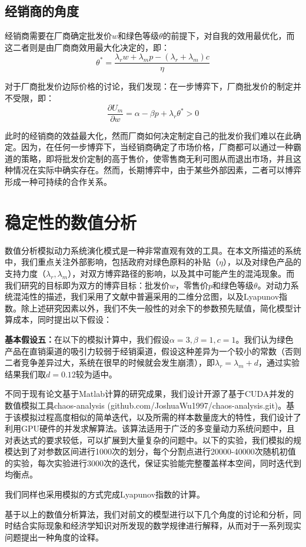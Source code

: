 \documentclass{article}
\begin{document}
\subsection{经销商的角度}
\par 经销商需要在厂商确定批发价$w$和绿色等级$\theta$的前提下，对自我的效用最优化，而这二者则是由厂商商效用最大化决定的，即：
\begin{equation}\label{t_star}
    \theta^*=\frac{\lambda_rw+\lambda_mp-(\lambda_r+\lambda_m)c}{\eta}
\end{equation}
\par 对于厂商批发价边际价格的讨论，我们发现：在一步博弈下，厂商批发价的制定并不受限，即：
\begin{equation}\label{w_star}
    \frac{\partial U_m}{\partial w}=\alpha-\beta p+\lambda_r\theta^*>0
\end{equation}
\par 此时的经销商的效益最大化，然而厂商如何决定制定自己的批发价我们难以在此确定。因为，在任何一步博弈下，当经销商确定了市场价格，厂商都可以通过一种霸道的策略，即将批发价定制的高于售价，使零售商无利可图从而退出市场，并且这种情况在实际中确实存在。然而，长期博弈中，由于某些外部因素，二者可以博弈形成一种可持续的合作关系。
\section{稳定性的数值分析}
\par 数值分析模拟动力系统演化模式是一种非常直观有效的工具。在本文所描述的系统中，我们重点关注外部影响，包括政府对绿色原料的补贴（$\eta$），以及对绿色产品的支持力度（$\lambda_r, \lambda_m$），对双方博弈路径的影响，以及其中可能产生的混沌现象。而我们研究的目标即为双方的博弈目标：批发价$w$，零售价$p$和绿色等级$\theta$。对动力系统混沌性的描述，我们采用了文献中普遍采用的二维分岔图，以及Lyapunov指数\cite{2017Tang}\cite{2018Zhang}\cite{2015Zhang}\cite{2018Huang}。除上述研究因素以外，我们不失一般性的对余下的参数预先赋值，简化模型计算成本，同时提出以下假设：
\par \textbf{基本假设五：}在以下的模拟计算中，我们假设$\alpha=3, \beta=1, c=1$。我们认为绿色产品在直销渠道的吸引力较弱于经销渠道，假设这种差异为一个较小的常数（否则二者竞争差异过大，系统在很早的时候就会发生崩溃），即$\lambda_r=\lambda_m+d$，通过实验结果我们取$d=0.12$较为适中。
\par 不同于现有论文基于Matlab计算的研究成果，我们设计开源了基于CUDA并发的数值模拟工具chaos-analysis (github.com/JoshuaWu1997/chaos-analysis.git)。基于该模拟过程高度相似的简单迭代，以及所需的样本数量庞大的特性，我们设计了利用GPU硬件的并发求解算法。该算法适用于广泛的多变量动力系统问题中，且对表达式的要求较低，可以扩展到大量复杂的问题中。以下的实验，我们模拟的规模达到了对参数区间进行1000次的划分，每个分割点进行20000-40000次随机初值的实验，每次实验进行3000次的迭代，保证实验能完整覆盖样本空间，同时迭代到均衡点。
\par 我们同样也采用模拟的方式完成Lyapunov指数的计算。
\par 基于以上的数值分析算法，我们对前文的模型进行以下几个角度的讨论和分析，同时结合实际现象和经济学知识对所发现的数学规律进行解释，从而对于一系列现实问题提出一种角度的诠释。
\end{document}

